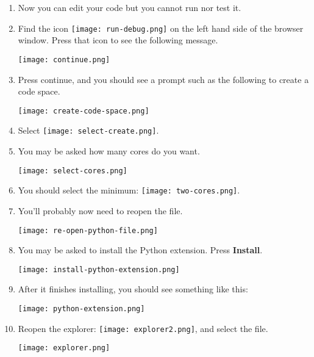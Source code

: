 \begin{enumerate}

\item Now you can edit your code but you cannot run nor test it.

\item Find the icon \texttt{[image: run-debug.png]} on the
  left hand side of the browser window.  Press that icon to see the
  following message.

\noindent\texttt{[image: continue.png]}

\item Press continue, and you should see a prompt such as the
  following to create a code space.

\noindent\texttt{[image: create-code-space.png]}

\item Select \texttt{[image: select-create.png]}.

\item You may be asked how many cores do you want.

\noindent\texttt{[image: select-cores.png]}

\item You should select the minimum: \texttt{[image: two-cores.png]}.

\item You'll probably now need to reopen the  file.

\noindent\texttt{[image: re-open-python-file.png]}

\item You may be asked to install the Python extension.  Press \textbf{Install}.

\noindent\texttt{[image: install-python-extension.png]}

  

\item After it finishes installing,   you should see something like this:

\noindent\texttt{[image: python-extension.png]}

\item Reopen the explorer: \texttt{[image: explorer2.png]},
  and select the  file.

\noindent\texttt{[image: explorer.png]}
\end{enumerate}

\clearpage


